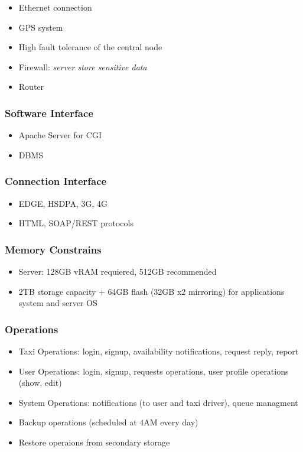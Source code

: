 \documentclass[english]{article}
\begin{document}
\begin{itemize}
	\item Ethernet connection
	\item GPS system
	\item High fault tolerance of the central node
	\item Firewall: \emph{server store sensitive data}
	\item Router
\end{itemize}

\subsubsection{Software Interface}

\begin{itemize}
	\item Apache Server for CGI
	\item DBMS
\end{itemize}

\subsubsection{Connection Interface}

\begin{itemize}
	\item EDGE, HSDPA, 3G, 4G
	\item HTML, SOAP/REST protocols
\end{itemize}

\subsubsection{Memory Constrains}

\begin{itemize}
	\item Server: 128GB vRAM  requiered, 512GB recommended
	\item 2TB storage capacity + 64GB flash (32GB x2 mirroring) for applications system and server OS
\end{itemize}

\subsubsection{Operations}

\begin{itemize}
	\item Taxi Operations: login, signup, availability notifications, request reply, report
	\item User Operations: login, signup, requests operations, user profile operations (show, edit)
	\item System Operations: notifications (to user and taxi driver), queue managment
	\item Backup operations (scheduled at 4AM every day)
	\item Restore operaions from secondary storage
\end{itemize}
\end{document}
